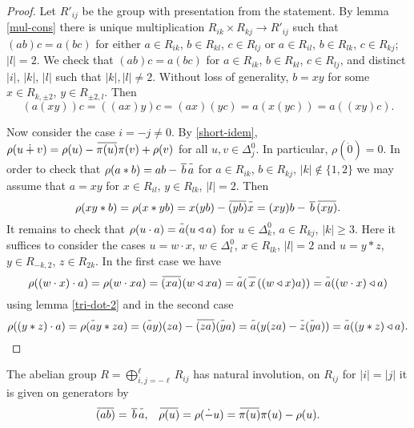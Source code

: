 \documentclass{article}
\theoremstyle{definition}
\newcommand{\dotminus}{\mathbin{\dot{-}}}
\newcommand{\inv}[1]{
    \!\;\overline{
        \!\!\:#1\vphantom !\!\!\:
    }\;\!
}
\begin{document}
\begin{proof}
    Let \(R'_{ij}\) be the group with presentation from the statement. By lemma \ref{mul-cons} there is unique multiplication \(
        R_{ik} \times R_{kj} \to R'_{ij}
    \) such that \(
        (ab) c = a (bc)
    \) for either \(a \in R_{ik}\), \(b \in R_{kl}\), \(c \in R_{lj}\) or \(a \in R_{il}\), \(b \in R_{lk}\), \(c \in R_{kj}\); \(|l| = 2\). We check that \(
        (ab) c = a (bc)
    \) for \(a \in R_{ik}\), \(b \in R_{kl}\), \(c \in R_{lj}\), and distinct \(|i|\), \(|k|\), \(|l|\) such that \(|k|, |l| \neq 2\). Without loss of generality, \(
        b = xy
    \) for some \(x \in R_{k, \pm 2}\), \(y \in R_{\pm 2, l}\). Then \[
        (a (xy)) c
        =
        ((ax) y) c
        =
        (ax) (yc)
        =
        a (x (yc))
        =
        a ((xy) c).
    \]

    Now consider the case \(i = -j \neq 0\). By \ref{short-idem}, \(
        \rho(u \dotplus v)
        =
        \rho(u) - \inv{\pi(u)} \pi(v) + \rho(v)
    \) for all \(u, v \in \Delta^0_j\). In particular, \(
        \rho(\dot 0) = 0
    \). In order to check that \(
        \rho(a * b) = ab - \inv{\,b\,} \inv a
    \) for \(a \in R_{ik}\), \(b \in R_{kj}\), \(|k| \notin \{1, 2\}\) we may assume that \(a = xy\) for \(x \in R_{il}\), \(y \in R_{lk}\), \(|l| = 2\). Then \[
        \rho(xy * b)
        =
        \rho(x * y b)
        =
        x (y b) - \inv{ (y b) } \inv x
        =
        (xy) b - \inv{\,b\,} \inv{ (xy) }.
    \] It remains to check that \(
        \rho(u \cdot a) = \inv a (u \triangleleft a)
    \) for \(u \in \Delta^0_k\), \(a \in R_{kj}\), \(|k| \geq 3\). Here it suffices to consider the cases \(u = w \cdot x\), \(w \in \Delta^0_l\), \(x \in R_{lk}\), \(|l| = 2\) and \(u = y * z\), \(y \in R_{-k, 2}\), \(z \in R_{2k}\). In the first case we have \[
        \rho((w \cdot x) \cdot a)
        =
        \rho(w \cdot xa)
        =
        \inv{ (xa) } (w \triangleleft xa)
        =
        \inv a (\inv{\,x\,} ((w \triangleleft x) a))
        =
        \inv a ((w \cdot x) \triangleleft a)
    \] using lemma \ref{tri-dot-2} and in the second case \[
        \rho((y * z) \cdot a)
        =
        \rho(\inv a y * za)
        =
        (\inv a y) (za) - \inv{ (za) } (\inv y a)
        =
        \inv a (y (za) - \inv z (\inv y a))
        =
        \inv a ((y * z) \triangleleft a).
    \qedhere\]
\end{proof}

The abelian group \(
    R = \bigoplus_{i, j = -\ell}^\ell R_{ij}
\) has natural involution, on \(R_{ij}\) for \(|i| = |j|\) it is given on generators by
\begin{align*}
    \inv{ (ab) } &= \inv{\,b\,} \inv a,
    &
    \inv{ \rho(u) }
    =
    \rho(\dotminus u)
    =
    \inv{\pi(u)} \pi(u) - \rho(u).
\end{align*}
\end{document}
